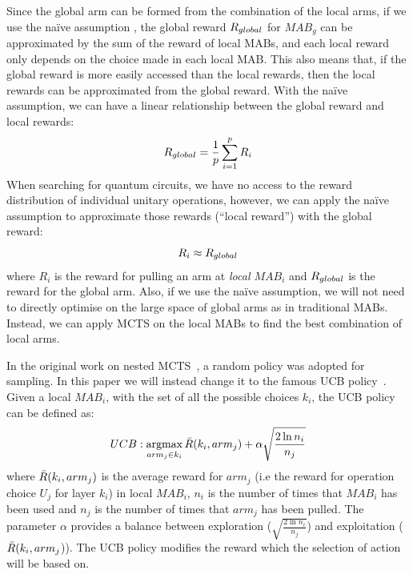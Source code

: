 \documentclass{ieeeaccess}
\DeclareMathOperator*{\argmax}{argmax}
\begin{document}
  Since the global arm can be formed from the combination of the local arms, if we use the na\"ive assumption \cite{CMAB_RTS}, the global reward $R_{\rm global}$ for $MAB_g$ can be approximated by the sum of the reward of local MABs, and each local reward only depends on the choice made in each local MAB. This also means that, if the global reward is more easily accessed than the local rewards, then the local rewards can be approximated from the global reward. With the na\"ive assumption, we can have a linear relationship between the global reward and local rewards:
  \begin{equation}
      R_{\rm global} = \frac{1}{p}\sum_{i=1}^p R_i
  \end{equation}
  When searching for quantum circuits, we have no access to the reward distribution of individual unitary operations, however, we can apply the na\"ive assumption to approximate those rewards (``local reward'') with the global reward: 
  \begin{equation}
      R_{i} \approx R_{\rm global}
  \end{equation}
  where $R_{i}$ is the reward for pulling an arm at \textit{local $MAB_i$} and $R_{\rm global}$ is the reward for the global arm.
  Also, if we use the na\"ive assumption, we will not need to directly optimise on the large space of global arms as in  traditional MABs. Instead, we can apply MCTS on the local MABs to find the best combination of local arms.
  
  In the original work on nested MCTS~\cite{nestedmontecarlosearch}, a random policy was adopted for sampling. In this paper we will instead change it to the famous UCB policy~\cite{UCB_paper_10.5555/944919.944941}. Given a local $MAB_i$, with the set of all the possible choices $k_i$, the UCB policy can be defined as:
  \begin{equation}
      UCB: \argmax_{arm_j\in k_i} \Bar{R}(k_i, arm_j) + \alpha \sqrt{\frac{2\ln n_i}{n_j}}
  \end{equation}
  where $\Bar{R}(k_i, arm_j)$ is the average reward for $arm_j$ (i.e the reward for operation choice $U_j$  for layer $k_i$) in local $MAB_i$, $n_i$ is the number of times that $MAB_i$ has been used and $n_j$ is the number of times that $arm_j$ has been pulled. The parameter $\alpha$ provides a balance between exploration ($\sqrt{\frac{2\ln n_i}{n_j}}$) and exploitation ($\Bar{R}(k_i, arm_j$)). The UCB policy modifies the reward which the selection of action will be based on. 
  
\end{document}
